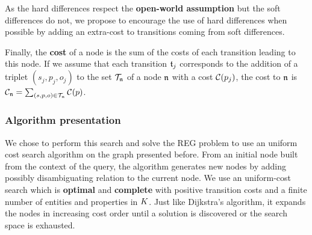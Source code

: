 \documentclass[a4paper,11pt,twoside]{StyleThese}
\begin{document}
As the hard differences respect the \textbf{open-world assumption} but the soft differences do not, we propose to encourage the use of hard differences when possible by adding an extra-cost to transitions coming from soft differences.

Finally, the \textbf{cost} of a node is the sum of the costs of each transition leading to this node. If we assume that each transition $\mathfrak{t}_j$ corresponds to the addition of a triplet $(s_j, p_j, o_j)$ to the set $\mathcal{T}_{\mathfrak{n}}$ of a node $\mathfrak{n}$ with a cost $\mathcal{C}(p_j)$, the cost to $\mathfrak{n}$ is $\mathcal{C}_{\mathfrak{n}} = \sum_{(s, p, o) \in \mathcal{T}_{\mathfrak{n}}} \mathcal{C}(p)$. 

\subsubsection{Algorithm presentation}
We chose to perform this search and solve the REG problem to use an uniform cost search algorithm on the graph presented before.
From an initial node built from the context of the query, the algorithm generates new nodes by adding possibly disambiguating relation to the current node. We use an uniform-cost search which is \textbf{optimal} and \textbf{complete} with positive transition costs and a finite number of entities and properties in $K$. Just like Dijkstra's algorithm, it expands the nodes in increasing cost order until a solution is discovered or the search space is exhausted.
\end{document}
